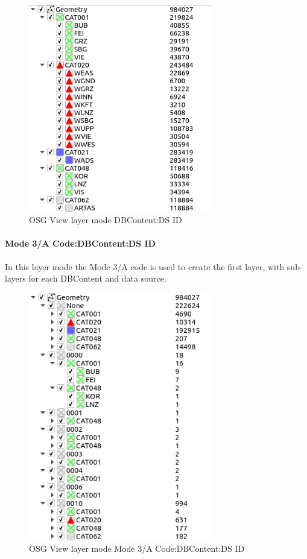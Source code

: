 \begin{figure}[H]
    \center
    \includegraphics[width=8cm,frame]{figures/osgview_group_dbcont_ds.png}
  \caption{OSG View layer mode DBContent:DS ID}
\end{figure}

\paragraph{Mode 3/A Code:DBContent:DS ID}

In this layer mode the Mode 3/A code is used to create the first layer, with sub-layers for each DBContent and data source.

\begin{figure}[H]
\center
    \includegraphics[width=8cm,frame]{figures/osgview_group_ma_dbcont.png}
  \caption{OSG View layer mode Mode 3/A Code:DBContent:DS ID}
\end{figure}

